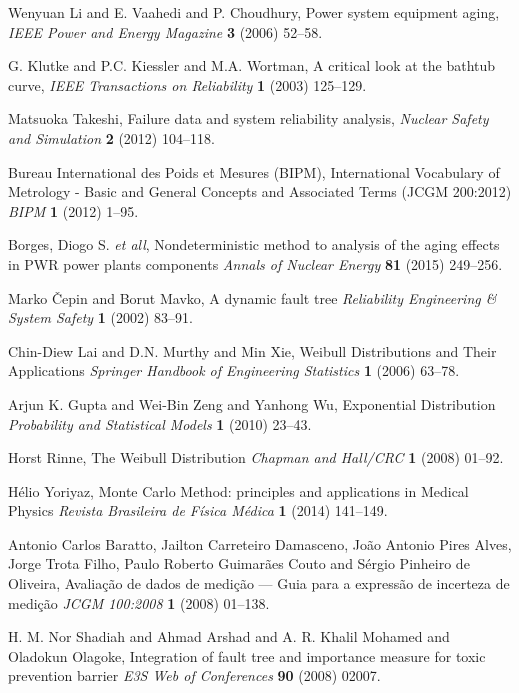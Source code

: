 \documentclass{ws-m3as}
\begin{document}
\begin{thebibliography}{0}
	
Wenyuan Li and E. Vaahedi and P. Choudhury, Power system equipment aging, {\it IEEE Power and Energy Magazine} {\bf 3} (2006) 52--58.

G. Klutke and P.C. Kiessler and M.A. Wortman, A critical look at the bathtub curve, {\it IEEE Transactions on Reliability} {\bf 1} (2003) 125--129.

Matsuoka Takeshi, Failure data and system reliability analysis, {\it Nuclear Safety and Simulation} {\bf 2} (2012) 104--118.

Bureau International des Poids et Mesures (BIPM), International Vocabulary of Metrology -  Basic and General Concepts and Associated Terms (JCGM 200:2012) {\it BIPM} {\bf 1} (2012) 1--95.

Borges, Diogo S. {\it et all}, Nondeterministic method to analysis of the aging effects in PWR power plants components {\it Annals of Nuclear Energy} {\bf 81} (2015) 249--256.

Marko {\v{C}}epin and Borut Mavko, A dynamic fault tree {\it Reliability Engineering {\&} System Safety} {\bf 1} (2002) 83--91.

Chin-Diew Lai and D.N. Murthy and Min Xie, Weibull Distributions and Their Applications {\it Springer Handbook of Engineering Statistics} {\bf 1} (2006) 63--78.

Arjun K. Gupta and Wei-Bin Zeng and Yanhong Wu, Exponential Distribution {\it Probability and Statistical Models} {\bf 1} (2010) 23--43.

Horst Rinne, The Weibull Distribution {\it Chapman and Hall/{CRC}} {\bf 1} (2008) 01--92.

Hélio Yoriyaz, Monte Carlo Method: principles and applications in Medical Physics {\it Revista Brasileira de Física Médica} {\bf 1} (2014) 141--149.

Antonio Carlos Baratto, Jailton Carreteiro Damasceno, João Antonio Pires Alves, Jorge Trota Filho, Paulo Roberto Guimarães Couto and Sérgio Pinheiro de Oliveira, Avaliação de dados de medição — Guia para a expressão de incerteza de medição {\it JCGM 100:2008} {\bf 1} (2008) 01--138.

H. M. Nor Shadiah and Ahmad Arshad and A. R. Khalil Mohamed and Oladokun Olagoke, Integration of fault tree and importance measure for toxic prevention barrier {\it E3S Web of Conferences} {\bf 90} (2008) 02007.


\end{thebibliography}
\end{document}
